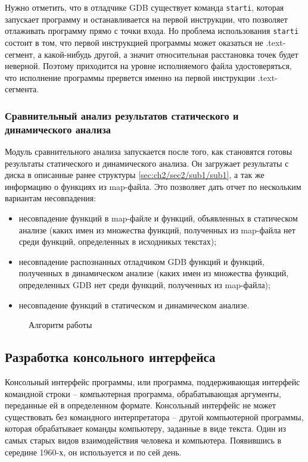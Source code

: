 Нужно отметить, что в отладчике GDB существует команда \texttt{starti}, которая запускает программу и 
останавливается на первой инструкции, что позволяет отлаживать программу прямо с точки входа.
Но проблема использования \texttt{starti} состоит в том, что первой инструкцией программы может оказаться
не .text-сегмент, а какой-нибудь другой, а значит относительная расстановка точек будет неверной.
Поэтому приходится на уровне исполняемого файла удостоверяться, что исполнение программы прервется
именно на первой инструкции .text-сегмента.

\subsubsection{Сравнительный анализ результатов статического и динамического анализа}\label{sec:ch2/sec2/sub3/sub3}
Модуль сравнительного анализа запускается после того, как становятся готовы результаты статического и
динамического анализа.
Он загружает результаты с диска в описанные ранее структуры \autoref{sec:ch2/sec2/sub1/sub1}, а так же
информацию о функциях из map-файла.
Это позволяет дать отчет по нескольким вариантам несовпадения:
\begin{itemize}
    \item несовпадение функций в map-файле и функций, объявленных в статическом анализе
        (каких имен из множества функций, полученных из map-файла нет среди функций, определенных в исходникых текстах);
    \item несовпадение распознанных отладчиком GDB функций и функций, полученных в динамическом анализе
        (каких имен из множества функций, определенных GDB нет среди функций, полученных из map-файла);
    \item несовпадение функций в статическом и динамическом анализе.
\end{itemize}

\begin{figure}[!htbp]
    \centerfloat{
        
    }
    \caption{Алгоритм работы {\ProgModule}\label{fig:algorithm}}
\end{figure}

\subsection{Разработка консольного интерфейса {\ProgModule}}\label{sec:ch2/sec2/sub4}
Консольный интерфейс программы, или программа, поддерживающая интерфейс командной строки --
компьютерная программа, обрабатывающая аргументы, переданные ей в определенном формате. 
Консольный интерфейс не может существовать без командного интерпретатора -- другой компьютерной программы, которая
обрабатывает команды компьютеру, заданные в виде текста.
Один из самых старых видов взаимодействия человека и компьютера.
Появившись в середине 1960-х, он используется и по сей день.


